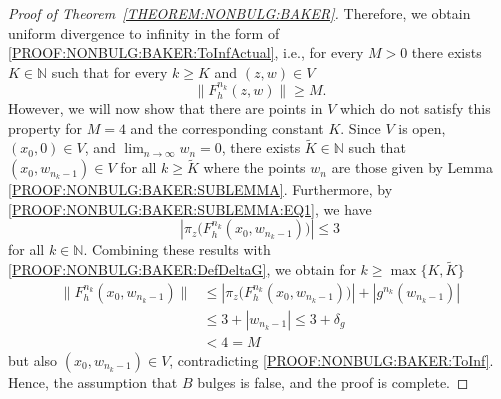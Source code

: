 \documentclass[a4paper, 12pt, twoside]{amsart}
\theoremstyle{definition}
\numberwithin{equation}{section}
\newcommand{\N}{{\mathbb N}}
\begin{document}
\begin{proof}[Proof of Theorem~\ref{THEOREM:NONBULG:BAKER}]
    Therefore, we obtain uniform divergence to infinity in the form of \eqref{PROOF:NONBULG:BAKER:ToInfActual}, i.e., for every $M > 0$ there exists $K \in \N$ such that for every $k \geq K$ and $(z,w) \in V$
    \begin{equation}\label{PROOF:NONBULG:BAKER:ToInf}
        \|{F_h^{n_k}(z,w)}\| \geq M.
    \end{equation}
    However, we will now show that there are points in $V$ which do not satisfy this property for $M = 4$ and the corresponding constant $K$. 
    Since $V$ is open, $(x_0,0) \in V$, and $\lim_{n\to\infty} w_n = 0$, there exists $\tilde{K} \in \N$ such that $(x_0, w_{n_k - 1}) \in V$ for all $k \geq \tilde{K}$ where the points $w_n$ are those given by Lemma \ref{PROOF:NONBULG:BAKER:SUBLEMMA}.
    Furthermore, by \eqref{PROOF:NONBULG:BAKER:SUBLEMMA:EQ1}, we have
    \begin{equation}
        |{\pi_z( F_h^{n_k}(x_0, w_{n_k - 1})})| \leq 3
    \end{equation} 
    for all $k\in\N$.
    Combining these results with \eqref{PROOF:NONBULG:BAKER:DefDeltaG}, we obtain for $k \geq \max\{K, \tilde{K}\}$
    \begin{align*}
        \|{F_h^{n_k}(x_0,w_{n_k - 1})}\| &\leq |{\pi_z( F_h^{n_k}(x_0, w_{n_k - 1})})| + |{g^{n_k}(w_{n_k - 1})}| \\
        &\leq 3 + |{w_{n_k - 1}}| %
        \leq 3 + \delta_g \\
        &< 4 = M
    \end{align*}
    but also $(x_0, w_{n_k - 1}) \in V$, contradicting \eqref{PROOF:NONBULG:BAKER:ToInf}. 
    Hence, the assumption that $B$ bulges is false, and the proof is complete.
\end{proof}
\end{document}
